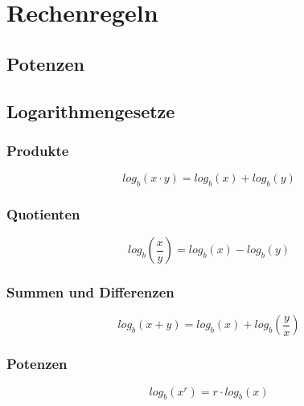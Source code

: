 \section{Rechenregeln}
\subsection{Potenzen}
\subsection{Logarithmengesetze}
\subsubsection{Produkte}
\[ \boxed{log_b(x \cdot y) = log_b(x) + log_b(y)} \]
\subsubsection{Quotienten}
\[ \boxed{log_b \left( \frac{x}{y} \right) = log_b(x) - log_b(y)} \]
\subsubsection{Summen und Differenzen}
\[ \boxed{log_b(x + y) = log_b(x) + log_b\left(\frac{y}{x}\right)} \]
\subsubsection{Potenzen}
\[ \boxed{log_b(x^r) = r \cdot log_b(x)} \]
